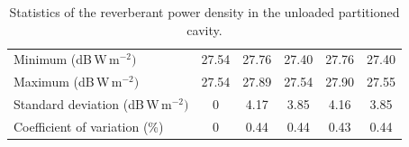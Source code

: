 \documentclass[a4paper]{article}
\numberwithin{equation}{section}
\begin{document}
\begin{table}[ht]
\begin{center}
\begin{tabular}{|l|c|c|c|c|c|}
Minimum (dB\,W\,m$^{-2})$            &27.54        &27.76           &27.40           &27.76           &27.40 \\
Maximum (dB\,W\,m$^{-2})$            &27.54        &27.89           &27.54           &27.90           &27.55 \\
Standard deviation (dB\,W\,m$^{-2})$ &0            &4.17            &3.85            &4.16            &3.85  \\
Coefficient of variation (\%)        &0            &0.44            &0.44            &0.43            &0.44  \\
\hline
\end{tabular}
\end{center}
\caption{\label{tb:partempty} Statistics of the reverberant power density in the unloaded partitioned cavity.}
\end{table}
\end{document}

